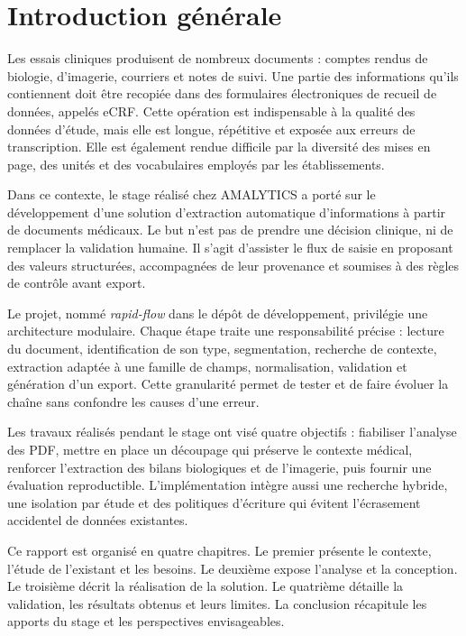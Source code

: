 \chapter*{Introduction générale}

Les essais cliniques produisent de nombreux documents : comptes rendus de biologie, d'imagerie, courriers et notes de suivi. Une partie des informations qu'ils contiennent doit être recopiée dans des formulaires électroniques de recueil de données, appelés eCRF. Cette opération est indispensable à la qualité des données d'étude, mais elle est longue, répétitive et exposée aux erreurs de transcription. Elle est également rendue difficile par la diversité des mises en page, des unités et des vocabulaires employés par les établissements.

Dans ce contexte, le stage réalisé chez AMALYTICS a porté sur le développement d'une solution d'extraction automatique d'informations à partir de documents médicaux. Le but n'est pas de prendre une décision clinique, ni de remplacer la validation humaine. Il s'agit d'assister le flux de saisie en proposant des valeurs structurées, accompagnées de leur provenance et soumises à des règles de contrôle avant export.

Le projet, nommé \emph{rapid-flow} dans le dépôt de développement, privilégie une architecture modulaire. Chaque étape traite une responsabilité précise : lecture du document, identification de son type, segmentation, recherche de contexte, extraction adaptée à une famille de champs, normalisation, validation et génération d'un export. Cette granularité permet de tester et de faire évoluer la chaîne sans confondre les causes d'une erreur.

Les travaux réalisés pendant le stage ont visé quatre objectifs : fiabiliser l'analyse des PDF, mettre en place un découpage qui préserve le contexte médical, renforcer l'extraction des bilans biologiques et de l'imagerie, puis fournir une évaluation reproductible. L'implémentation intègre aussi une recherche hybride, une isolation par étude et des politiques d'écriture qui évitent l'écrasement accidentel de données existantes.

Ce rapport est organisé en quatre chapitres. Le premier présente le contexte, l'étude de l'existant et les besoins. Le deuxième expose l'analyse et la conception. Le troisième décrit la réalisation de la solution. Le quatrième détaille la validation, les résultats obtenus et leurs limites. La conclusion récapitule les apports du stage et les perspectives envisageables.
